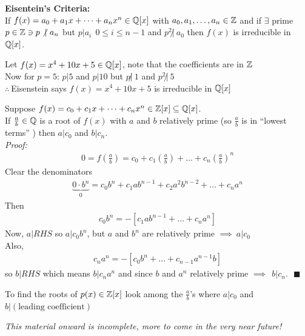 \newpage
\begin{tcolorbox}
    \textbf{Eisentein's Criteria:} \\ \steezybreak 
    If $f(x)=a_0+a_1x+ \dots + a_n x^n \in {\mathbb{ Q}}[x]$ with $a_0, a_1, \dots, a_n \in {\mathbb{ Z}}$ and if $\exists$ prime $p\in {\mathbb{ Z}}\ni p \not | \ a_n$ but $p|a_i \ \ 0\leq i \leq n-1$ and $p^2 \not | \ a_0$ then $f(x)$ is irreducible in ${\mathbb{ Q}}[x]$.
\end{tcolorbox}
\begin{example}
    Let $f(x)= x^4 + 10x + 5 \in {\mathbb{ Q}}[x]$, note that the coefficients are in ${\mathbb{ Z}}$ \\
    Now for $p=5$: $p|5$ and $p|10$ but $p\not | \ 1$ and $p^2 \not | \ 5$ \\
    $\therefore \ $Eisenstein says $f(x)=x^4+10x+5$ is irreducible in ${\mathbb{ Q}}[x]$
\end{example}
\begin{lemma*}
    Suppose $f(x) = c_0 + c_1x + \dots + c_n x^n \in {\mathbb{ Z}}[x] \subseteq {\mathbb{ Q}}[x]$. \\
    If $\frac{a}{b} \in {\mathbb{ Q}}$ is a root of $f(x)$ with $a$ and $b$ relatively prime (so $\frac{a}{b}$ is in ``lowest terms'' ) then $a|c_0$ and $b|c_n$. \\

    \noindent \textit{Proof: }
    \begin{align*}
        0 = f\left(\frac{a}{b}\right)= c_0 + c_1\left(\frac{a}{b}\right) + \dots + c_n\left(\frac{a}{b}\right)^n
    \end{align*}
    Clear the denominators
    \begin{align*}
        \underbrace{0\cdot b^n}_{0} =  c_0b^n + c_1ab^{n-1} + c_2a^2b^{n-2} + \dots + c_na^n
    \end{align*}
    Then
    \begin{align*}
        c_0b^n = -[c_1ab^{n-1} + \dots + c_na^n]
    \end{align*}
    Now, $a|RHS$ so $a|c_0b^n$, but $a$ and $b^n$ are relatively prime $\implies \ a|c_0$ \\
    Also,
    \begin{align*}
        c_na^n = -[c_0b^n + \dots + c_{n-1}a^{n-1}b]
    \end{align*}
    so $b| RHS$ which means $b|c_na^n$ and since $b$ and $a^n$ relatively prime $\implies \ \ b|c_n. \ \ \ \blacksquare$
\end{lemma*}
To find the roots of $p(x) \in {\mathbb{ Z}}[x]$ look among the $\frac{a}{b}$'s where $a|c_0$ and $b|(\text{leading coefficient})$
\begin{example}
    
\end{example}
\steezybreak \textit{This material onward is incomplete, more to come in the very near future!}
